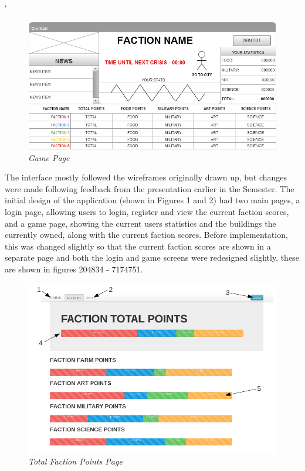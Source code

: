 `\documentclass{sig-alt-release2}
\begin{document}
\begin{figure}[!htbp]
  \caption{\textit{Game Page}}
  \begin{center}
		\includegraphics[scale=0.25]{img/w4.png}
  \end{center}
\end{figure}

The interface mostly followed the wireframes originally drawn up, but changes were made following feedback from the presentation earlier in the Semester. The initial design of the application (shown in Figures 1 and 2) had two main pages, a login page, allowing users to login, register and view the current faction scores, and a game page, showing the current users statistics and the buildings the currently owned, along with the current faction scores. Before implementation, this was changed slightly so that the current faction scores are shown in a separate page and both the login and game screens were redesigned slightly, these are shown in figures 204834 - 7174751.\\

\begin{figure}[!htbp]
  \caption{\textit{Total Faction Points Page}}
  \begin{center}
		\includegraphics[scale=0.30]{img/factionlabel.png}
  \end{center}
\end{figure}
\end{document}

